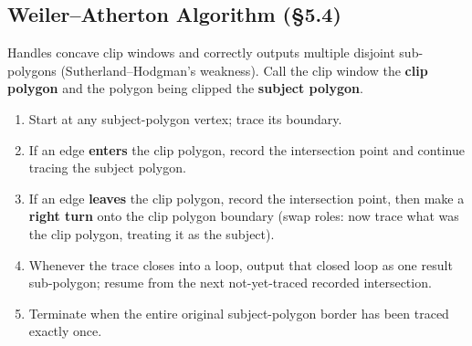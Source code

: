 \documentclass[12pt, a4paper]{article}
\newenvironment{answerbox}{\begin{mdframed}[style=answerframe]}{\end{mdframed}}
\begin{document}
\subsection{Weiler--Atherton Algorithm (\S5.4)}
\begin{answerbox}
Handles concave clip windows and correctly outputs multiple disjoint sub-polygons (Sutherland--Hodgman's weakness). Call the clip window the \textbf{clip polygon} and the polygon being clipped the \textbf{subject polygon}.
\begin{enumerate}[noitemsep]
  \item Start at any subject-polygon vertex; trace its boundary.
  \item If an edge \textbf{enters} the clip polygon, record the intersection point and continue tracing the subject polygon.
  \item If an edge \textbf{leaves} the clip polygon, record the intersection point, then make a \textbf{right turn} onto the clip polygon boundary (swap roles: now trace what was the clip polygon, treating it as the subject).
  \item Whenever the trace closes into a loop, output that closed loop as one result sub-polygon; resume from the next not-yet-traced recorded intersection.
  \item Terminate when the entire original subject-polygon border has been traced exactly once.
\end{enumerate}
\end{answerbox}

\end{document}
